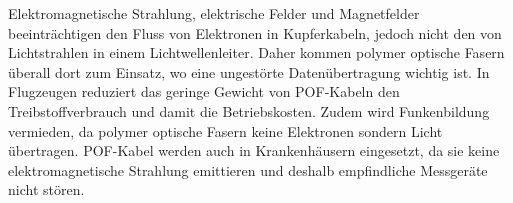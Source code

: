 
Elektromagnetische Strahlung, elektrische Felder und Magnetfelder
beeinträchtigen den Fluss von Elektronen in Kupferkabeln, jedoch nicht den von
Lichtstrahlen in einem Lichtwellenleiter. Daher kommen polymer optische Fasern
überall dort zum Einsatz, wo eine ungestörte Datenübertragung wichtig ist. In
Flugzeugen reduziert das geringe Gewicht von POF-Kabeln den Treibstoffverbrauch
und damit die Betriebskosten. Zudem wird Funkenbildung vermieden, da polymer
optische Fasern keine Elektronen sondern Licht übertragen. POF-Kabel werden auch
in Krankenhäusern eingesetzt, da sie keine elektromagnetische Strahlung
emittieren und deshalb empfindliche Messgeräte nicht stören.
